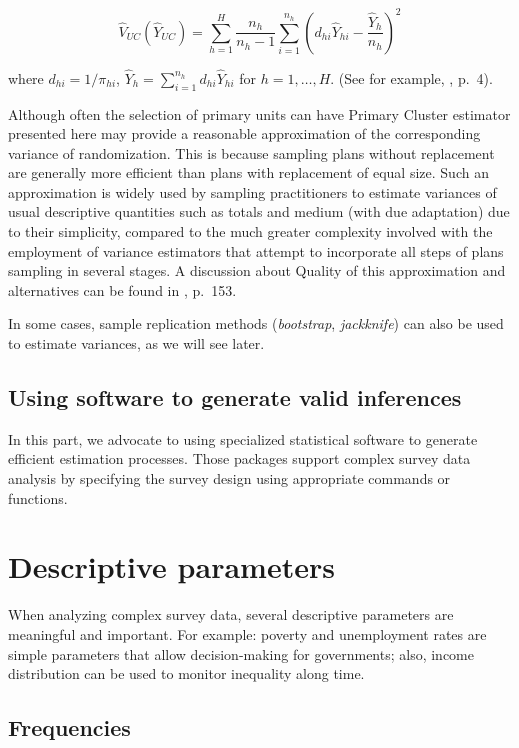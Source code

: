 \documentclass[
  12pt,
]{book}
\begin{document}
\[
\widehat{V}_{UC} \left( \widehat{Y}_{UC}\right) = \sum_{h=1}^{H} \frac{n_{h}}
{n_{h}-1} \sum_{i=1}^{n_{h}} \left( d_{hi} \widehat{Y}_{hi} - \frac{\widehat{Y}_{h}}{n_{h}} \right) ^{2}
\]

where \(d_{hi} = 1 / \pi_{hi}\), \(\widehat{Y}_{h} = \sum_{i=1}^{n_{h}} d_{hi} \widehat{Y}_{hi}\) for \(h=1,\ldots ,H\). (See for example, \citep{Shah1993}, p.~4).

Although often the selection of primary units can have Primary Cluster estimator presented here may provide a reasonable approximation of the corresponding variance of randomization. This is because sampling plans without replacement are generally more efficient than plans with replacement of equal size. Such an approximation is widely used by sampling practitioners to estimate variances of usual descriptive quantities such as totals and medium (with due adaptation) due to their simplicity, compared to the much greater complexity involved with the employment of variance estimators that attempt to incorporate all steps of plans sampling in several stages. A discussion about Quality of this approximation and alternatives can be found in \citep{SSW92}, p.~153.

In some cases, sample replication methods (\emph{bootstrap}, \emph{jackknife}) can also be used to estimate variances, as we will see later.

\section{Using software to generate valid inferences}\label{using-software-to-generate-valid-inferences}

In this part, we advocate to using specialized statistical software to generate efficient estimation processes. Those packages support complex survey data analysis by specifying the survey design using appropriate commands or functions.

\chapter{Descriptive parameters}\label{descriptive-parameters}

When analyzing complex survey data, several descriptive parameters are meaningful and important. For example: poverty and unemployment rates are simple parameters that allow decision-making for governments; also, income distribution can be used to monitor inequality along time.

\section{Frequencies}\label{frequencies}
\end{document}
